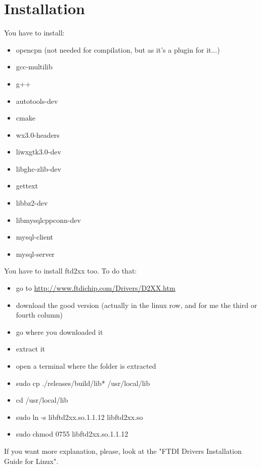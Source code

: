 \documentclass[11pt]{report}
\begin{document}
	    \chapter{Installation}
            You have to install:
            \begin{itemize}
                \item opencpn (not needed for compilation, but as it's a plugin for it...)
                \item gcc-multilib
                \item g++
                \item autotools-dev
                \item cmake
                \item wx3.0-headers
                \item liwxgtk3.0-dev
                \item libghc-zlib-dev
                \item gettext
                \item libbz2-dev
                \item libmysqlcppconn-dev 
                \item mysql-client
                \item mysql-server
            \end{itemize}
        \vspace{3cm}
            You have to install ftd2xx too. To do that:
            \begin{itemize}
                \item go to \url{http://www.ftdichip.com/Drivers/D2XX.htm}
                \item download the good version (actually in the linux row, and for me the third or fourth column)
                \item go where you downloaded it
                \item extract it
                \item open a terminal where the folder is extracted
                \item sudo cp ./releases/build/lib* /usr/local/lib
                \item cd /usr/local/lib
                \item sudo ln -s libftd2xx.so.1.1.12 libftd2xx.so
                \item sudo chmod 0755 libftd2xx.so.1.1.12
            \end{itemize}
            If you want more explanation, please, look at the "FTDI Drivers Installation Guide for Linux".
\end{document}
